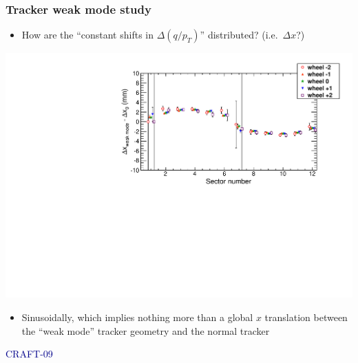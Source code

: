 \documentclass[compress]{beamer}
\begin{document}
\begin{frame}
\frametitle{Tracker weak mode study}

\begin{itemize}
\item How are the ``constant shifts in $\Delta(q/p_T)$'' distributed?  (i.e.\ $\Delta x$?)
\end{itemize}

\includegraphics[width=\linewidth]{weakmode_xsummary1.pdf}

\begin{itemize}
\item Sinusoidally, which implies nothing more than a global $x$
  translation between the ``weak mode'' tracker geometry and the
  normal tracker
\end{itemize}

\hfill \textcolor{darkblue}{\scriptsize CRAFT-09}
\end{frame}
\end{document}
